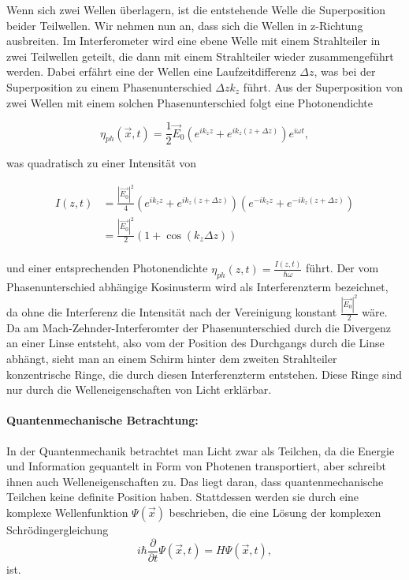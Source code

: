 \documentclass[a4paper,ngerman]{scrartcl}
\begin{document}
Wenn sich zwei Wellen überlagern, ist die entstehende Welle die Superposition beider Teilwellen.
Wir nehmen nun an, dass sich die Wellen in z-Richtung ausbreiten.
Im Interferometer wird eine ebene Welle mit einem Strahlteiler in zwei Teilwellen geteilt, die dann mit einem Strahlteiler wieder
zusammengeführt werden. Dabei erfährt eine der Wellen eine Laufzeitdifferenz $\Delta z$, was bei der Superposition zu
einem Phasenunterschied $\Delta z k_z$ führt. Aus der Superposition von zwei Wellen mit einem solchen Phasenunterschied
folgt eine Photonendichte

\begin{equation}
  \eta_{ph}(\vec{x},t) = \frac{1}{2} \vec{E}_0 \left( e^{i k_z z} + e^{i k_z (z + \Delta z)} \right) e^{i\omega t},
\end{equation}

was quadratisch zu einer Intensität von 

\begin{equation}
\label{eqn:intensitaet}
  \begin{split}
    I(z,t) &= \frac{|\vec{E_0}|^2 }{4} \left(e^{i k_z z} + e^{i k_z (z + \Delta z)} \right) \left(e^{-i k_z z} + e^{-i k_z (z + \Delta z)} \right)\\
    &= \frac{|\vec{E_0}|^2}{2}(1+\cos(k_z\Delta z) )\\
  \end{split}
\end{equation}

und einer entsprechenden Photonendichte $\eta_{ph}(z,t) = \frac{I(z,t)}{\hbar \omega}$ führt. Der vom Phasenunterschied abhängige
Kosinusterm wird als Interferenzterm bezeichnet, da ohne die Interferenz die Intensität nach der Vereinigung konstant $\frac{|\vec{E_0}|^2}{2}$
wäre. Da am Mach-Zehnder-Interferomter der Phasenunterschied durch die Divergenz an einer Linse entsteht, also vom der Position des Durchgangs
durch die Linse abhängt, sieht man an einem Schirm hinter dem zweiten Strahlteiler konzentrische Ringe, die durch diesen Interferenzterm
entstehen. Diese Ringe sind nur durch die Welleneigenschaften von Licht erklärbar.

\paragraph{Quantenmechanische Betrachtung:}
In der Quantenmechanik betrachtet man Licht zwar als Teilchen, da die Energie und Information gequantelt in Form von Photenen
transportiert, aber schreibt ihnen auch Welleneigenschaften zu. Das liegt daran, dass quantenmechanische Teilchen keine definite
Position haben. Stattdessen werden sie durch eine komplexe Wellenfunktion $\Psi(\vec{x})$ beschrieben, die eine Lösung der
komplexen Schrödingergleichung 
\begin{equation}
  i \hbar \frac{\partial}{\partial t} \Psi(\vec{x},t) = H \Psi(\vec{x},t),
\end{equation}
ist.
\end{document}
